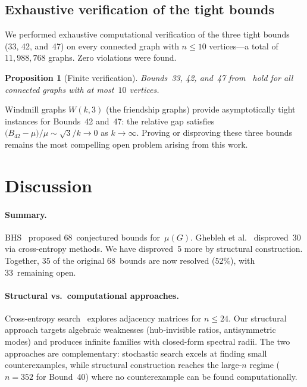 \documentclass[preprint,12pt]{elsarticle}
\newtheorem{proposition}[theorem]{Proposition}
\theoremstyle{definition}
\theoremstyle{remark}
\newcommand{\Lspec}{\mu}               %
\begin{document}
\subsection{Exhaustive verification of the tight bounds}\label{ssec:exhaustive}

We performed exhaustive computational verification of the three
tight bounds (33, 42, and~47) on every connected graph with $n \leq 10$
vertices---a total of $11{,}988{,}768$ graphs.
Zero violations were found.

\begin{proposition}[Finite verification]\label{thm:finite-verification}
  Bounds~33, 42, and~47 from~\cite{BHS2006} hold for all connected graphs
  with at most~$10$ vertices.
\end{proposition}

Windmill graphs $W(k,3)$ (the friendship graphs) provide asymptotically
tight instances for Bounds~42 and~47: the relative gap satisfies
$\bigl(B_{42} - \Lspec\bigr)/\Lspec \sim \sqrt{3}/k \to 0$ as
$k \to \infty$.  Proving or disproving these three bounds remains the
most compelling open problem arising from this work.


\section{Discussion}\label{sec:discussion}

\paragraph{Summary.}
BHS~\cite{BHS2006} proposed 68~conjectured bounds for~$\Lspec(G)$.
Ghebleh et al.~\cite{Ghebleh2024} disproved~30 via cross-entropy methods.
We have disproved~5 more by structural construction.
Together, 35 of the original 68~bounds are now resolved (52\%),
with 33~remaining open.

\paragraph{Structural vs.\ computational approaches.}
Cross-entropy search~\cite{Ghebleh2024,Wagner2021,BouffardBreen2025}
explores adjacency matrices for $n \leq 24$.
Our structural approach targets algebraic weaknesses
(hub-invisible ratios, antisymmetric modes)
and produces infinite families with
closed-form spectral radii.  The two approaches are complementary:
stochastic search excels at finding small counterexamples, while
structural construction reaches the large-$n$ regime ($n = 352$ for
Bound~40) where no counterexample can be found computationally.
\end{document}
